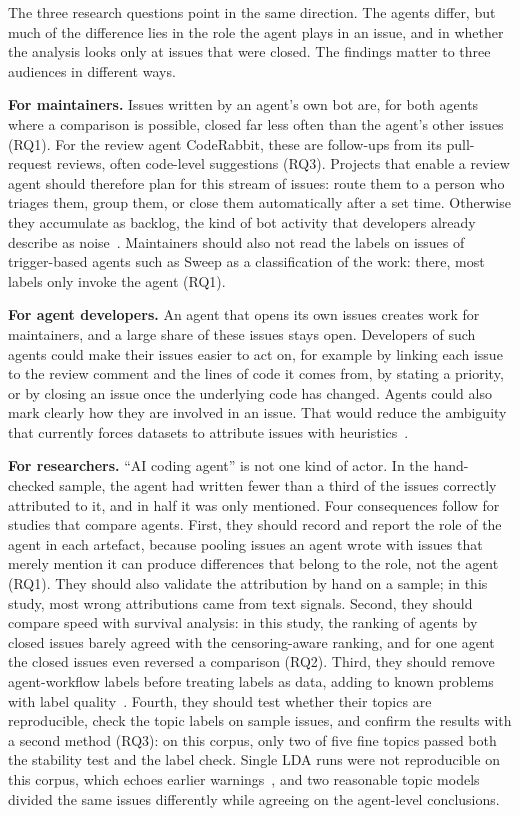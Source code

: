 The three research questions point in the same direction. The agents differ, but much of the difference lies in the role the agent plays in an issue, and in whether the analysis looks only at issues that were closed. The findings matter to three audiences in different ways.

\textbf{For maintainers.} Issues written by an agent's own bot are, for both agents where a comparison is possible, closed far less often than the agent's other issues (RQ1). For the review agent CodeRabbit, these are follow-ups from its pull-request reviews, often code-level suggestions (RQ3). Projects that enable a review agent should therefore plan for this stream of issues: route them to a person who triages them, group them, or close them automatically after a set time. Otherwise they accumulate as backlog, the kind of bot activity that developers already describe as noise~\cite{wessel2021disturb}. Maintainers should also not read the labels on issues of trigger-based agents such as Sweep as a classification of the work: there, most labels only invoke the agent (RQ1).

\textbf{For agent developers.} An agent that opens its own issues creates work for maintainers, and a large share of these issues stays open. Developers of such agents could make their issues easier to act on, for example by linking each issue to the review comment and the lines of code it comes from, by stating a priority, or by closing an issue once the underlying code has changed. Agents could also mark clearly how they are involved in an issue. That would reduce the ambiguity that currently forces datasets to attribute issues with heuristics~\cite{ghaleb2026codage,ghaleb2026fingerprinting}.

\textbf{For researchers.} ``AI coding agent'' is not one kind of actor. In the hand-checked sample, the agent had written fewer than a third of the issues correctly attributed to it, and in half it was only mentioned. Four consequences follow for studies that compare agents. First, they should record and report the role of the agent in each artefact, because pooling issues an agent wrote with issues that merely mention it can produce differences that belong to the role, not the agent (RQ1). They should also validate the attribution by hand on a sample; in this study, most wrong attributions came from text signals. Second, they should compare speed with survival analysis: in this study, the ranking of agents by closed issues barely agreed with the censoring-aware ranking, and for one agent the closed issues even reversed a comparison (RQ2). Third, they should remove agent-workflow labels before treating labels as data, adding to known problems with label quality~\cite{herzig2013bug}. Fourth, they should test whether their topics are reproducible, check the topic labels on sample issues, and confirm the results with a second method (RQ3): on this corpus, only two of five fine topics passed both the stability test and the label check. Single LDA runs were not reproducible on this corpus, which echoes earlier warnings~\cite{agrawal2018wrong}, and two reasonable topic models divided the same issues differently while agreeing on the agent-level conclusions.
